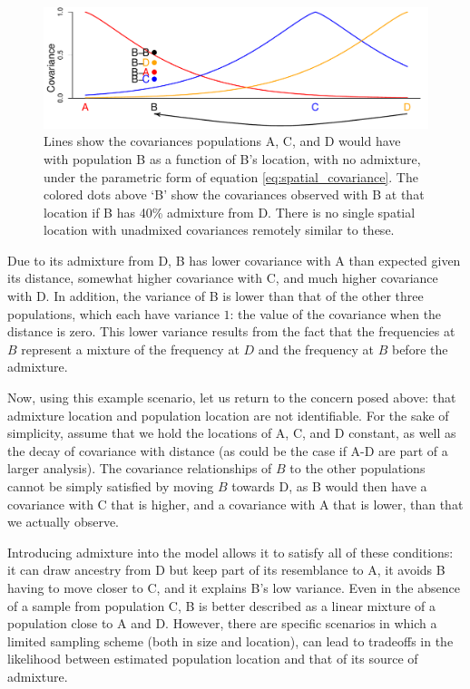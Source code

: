 \documentclass[12pt]{article}
\begin{document}
\begin{figure}[htp!]
	\centering
	\includegraphics[width=\textwidth]{figs/sims/Admix_covar_toy_fig.pdf}
	\caption{
    Lines show the covariances populations A, C, and D would have with population B as a function of B's location,
    with no admixture,
    under the parametric form of equation \eqref{eq:spatial_covariance}.
    The colored dots above `B' show the covariances observed with B at that location if B has 40\% admixture from D.
    There is no single spatial location with unadmixed covariances remotely similar to these.
    } \label{sfig:toy_admixture}
\end{figure}

Due to its admixture from D, B has lower covariance with A than expected given its distance, somewhat higher covariance with C, and much higher covariance with D. In addition, the variance of B is lower than that of the other three populations, which each have variance $1$: the value of the covariance when the distance is zero. This lower variance results from the fact that the frequencies at $B$ represent a mixture of the frequency at $D$ and the frequency at $B$ before the admixture. 

Now, using this example scenario, let us return to the concern posed above: that admixture location and population location are not identifiable.  For the sake of simplicity, assume that we hold the locations of A, C, and D constant, as well as the decay of covariance with distance (as could be the case if A-D are part of a larger analysis).  The covariance relationships of $B$ to the other populations cannot be simply satisfied by moving $B$ towards D, as B would then have a covariance with C that is higher, and a covariance with A that is lower, than that we actually observe. 

Introducing admixture into the model allows it to satisfy all of these conditions: it can draw ancestry from D but keep part of its resemblance to A, it avoids B having to move closer to C, and it explains B's low variance.  Even in the absence of a sample from population C, B is better described as a linear mixture of a population close to A and D.  However, there are specific scenarios in which a limited sampling scheme (both in size and location), can lead to tradeoffs in the likelihood between estimated population location and that of its source of admixture.
\end{document}
